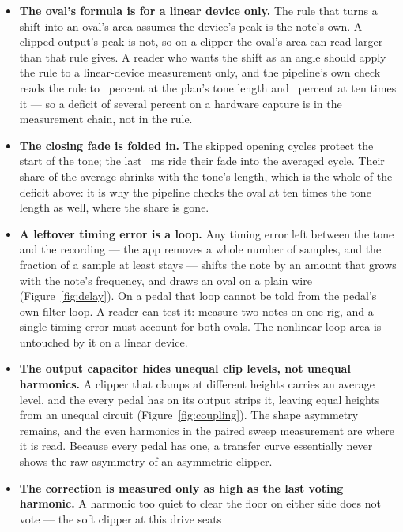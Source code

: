 \documentclass[11pt,a4paper]{article}
\begin{document}
\begin{itemize}
  \item \textbf{The oval's formula is for a linear device only.} The rule
  that turns a shift into an oval's area assumes the device's peak is the
  note's own. A clipped output's peak is not, so on a clipper the oval's
  area can read larger than that rule gives. A reader who wants the shift
  as an angle should apply the rule to a linear-device measurement only,
  and the pipeline's own check reads the rule to
  \tparityEllipseDeficitShort~percent at the plan's tone length and
  \tparityEllipseDeficitLong~percent at ten times it --- so a deficit of
  several percent on a hardware capture is in the measurement chain, not
  in the rule.
  \item \textbf{The closing fade is folded in.} The skipped opening cycles
  protect the start of the tone; the last \tcFadeMs{}~ms ride their fade
  into the averaged cycle. Their share of the average shrinks with the
  tone's length, which is the whole of the deficit above: it is why the
  pipeline checks the oval at ten times the tone length as well, where
  the share is gone.
  \item \textbf{A leftover timing error is a loop.} Any timing error left
  between the tone and the recording --- the app removes a whole number
  of samples, and the fraction of a sample at least stays --- shifts the
  note by an amount that grows with the note's frequency, and draws an
  oval on a plain wire (Figure~\ref{fig:delay}). On a pedal that
   loop cannot be told from the pedal's own filter
  loop. A reader can test it: measure two notes on one rig, and a single
  timing error must account for both ovals. The nonlinear loop area is
  untouched by it on a linear device.
  \item \textbf{The output capacitor hides unequal clip levels, not
  unequal harmonics.} A clipper that clamps at different heights carries
  an average level, and the  every pedal has on
  its output strips it, leaving equal heights from an unequal circuit
  (Figure~\ref{fig:coupling}). The shape asymmetry remains, and the even
  harmonics in the paired sweep measurement are where it is read. Because
  every pedal has one, a transfer curve essentially never shows the raw
  asymmetry of an asymmetric clipper.
  \item \textbf{The correction is measured only as high as the last
  voting harmonic.} A harmonic too quiet to clear the floor on either
  side does not vote --- the soft clipper at this drive seats

\end{itemize}
\end{document}
